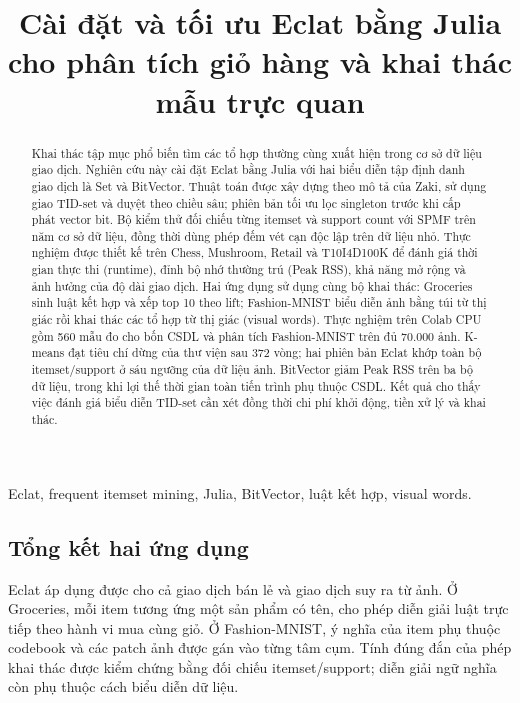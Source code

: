 \documentclass[conference,a4paper]{IEEEtran}
\renewcommand{\refname}{Tài liệu tham khảo}
\begin{document}
\renewcommand{\refname}{Tài liệu tham khảo}
\pagestyle{plain}
\title{Cài đặt và tối ưu Eclat bằng Julia\\cho phân tích giỏ hàng và khai thác mẫu trực quan}
\author{
}
\maketitle
\begin{abstract}
Khai thác tập mục phổ biến tìm các tổ hợp thường cùng xuất hiện trong cơ sở
dữ liệu giao dịch. Nghiên cứu này cài đặt Eclat bằng Julia với hai biểu
diễn tập định danh giao dịch là Set và BitVector. Thuật toán được xây dựng
theo mô tả của Zaki, sử dụng giao TID-set và duyệt theo chiều sâu; phiên
bản tối ưu lọc singleton trước khi cấp phát vector bit. Bộ kiểm thử đối
chiếu từng itemset và support count với SPMF trên năm cơ sở dữ liệu, đồng
thời dùng phép đếm vét cạn độc lập trên dữ liệu nhỏ. Thực nghiệm được thiết
kế trên Chess, Mushroom, Retail và T10I4D100K để đánh giá thời gian thực thi
(runtime), đỉnh bộ nhớ thường trú (Peak RSS), khả năng mở rộng và ảnh
hưởng của độ dài giao dịch. Hai ứng dụng sử dụng cùng bộ khai thác:
Groceries sinh luật kết hợp và xếp top 10 theo lift; Fashion-MNIST
biểu diễn ảnh bằng túi từ thị giác rồi khai thác các tổ hợp từ thị giác
(visual words).
Thực nghiệm trên Colab CPU gồm 560 mẫu đo cho bốn CSDL và phân tích
Fashion-MNIST trên đủ 70.000 ảnh. K-means đạt tiêu chí dừng của thư viện
sau 372 vòng; hai phiên bản Eclat khớp toàn bộ itemset/support ở sáu
ngưỡng của dữ liệu ảnh. BitVector giảm Peak RSS trên ba bộ dữ liệu,
trong khi lợi thế thời gian toàn tiến trình phụ thuộc CSDL. Kết quả cho
thấy việc đánh giá biểu diễn TID-set cần xét đồng thời chi phí khởi
động, tiền xử lý và khai thác.
\end{abstract}
\begin{IEEEkeywords}
Eclat, frequent itemset mining, Julia, BitVector, luật kết hợp, visual words.
\end{IEEEkeywords}





\subsection{Tổng kết hai ứng dụng}
Eclat áp dụng được cho cả giao dịch bán lẻ và giao dịch suy ra từ ảnh.
Ở Groceries, mỗi item tương ứng một sản phẩm có tên, cho phép diễn giải
luật trực tiếp theo hành vi mua cùng giỏ. Ở Fashion-MNIST, ý nghĩa của
item phụ thuộc codebook và các patch ảnh được gán vào từng tâm cụm.
Tính đúng đắn của phép khai thác được kiểm chứng bằng đối chiếu
itemset/support; diễn giải ngữ nghĩa còn phụ thuộc cách biểu diễn dữ liệu.
\end{document}
